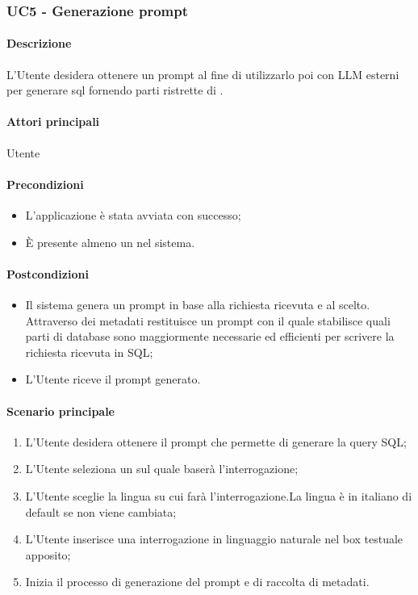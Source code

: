 \subsubsection{UC5 - Generazione prompt}\label{UC5}
\paragraph*{Descrizione}
L’Utente desidera ottenere un prompt al fine di utilizzarlo poi con LLM esterni per generare  sql fornendo parti ristrette di .

\paragraph*{Attori principali}
Utente

\paragraph*{Precondizioni}
\begin{itemize}
  \item L'applicazione è stata avviata con successo;
  \item È presente almeno un  nel sistema.
\end{itemize}

\paragraph*{Postcondizioni}
\begin{itemize}
  \item Il sistema genera un prompt in base alla richiesta ricevuta e al  scelto. Attraverso dei metadati restituisce un prompt con il quale stabilisce quali parti di database sono maggiormente necessarie ed efficienti per scrivere la richiesta ricevuta in SQL;
  \item L’Utente riceve il prompt generato.
\end{itemize}

\paragraph*{Scenario principale}
\begin{enumerate}
  \item L’Utente desidera ottenere il prompt che permette di generare la query SQL;
  \item L’Utente seleziona un  sul quale baserà l’interrogazione;
  \item L’Utente sceglie la lingua su cui farà l’interrogazione.La lingua è in italiano di default se non viene cambiata;
  \item L’Utente inserisce una interrogazione in linguaggio naturale nel box testuale apposito;
  \item Inizia il processo di generazione del prompt e di raccolta di metadati.
\end{enumerate}

